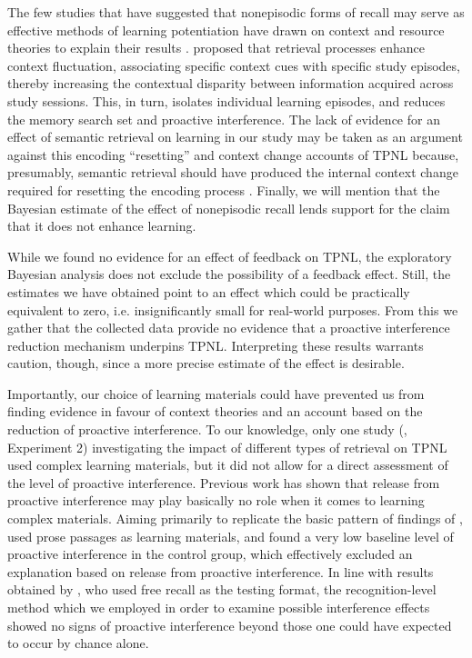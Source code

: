 \documentclass[../main.tex]{subfiles}
\begin{document}
The few studies that have suggested that nonepisodic forms of recall may serve 
as effective methods of learning potentiation have drawn on context and resource
theories to explain their results \citep{divisRetrievalSpeedsContext2014, 
pastotterRetrievalLearningFacilitates2011}. 
\cite{divisRetrievalSpeedsContext2014} proposed that retrieval processes 
enhance context fluctuation, associating specific context cues with specific 
study episodes, thereby increasing the contextual disparity between information 
acquired across study sessions. This, in turn, isolates individual learning 
episodes, and reduces the memory search set and proactive interference.
The lack of evidence for an effect of semantic retrieval 
on learning in our study may be taken as an argument against this encoding 
``resetting'' and context change accounts of TPNL because, presumably, semantic 
retrieval should have produced the internal context change required for 
resetting the encoding process 
\citep{pastotterRetrievalLearningFacilitates2011}. Finally, we will mention that
the Bayesian estimate of the effect of nonepisodic recall lends support for the
claim that it does not enhance learning.

While we found no evidence for an effect of feedback on TPNL, the exploratory 
Bayesian analysis does not exclude the possibility of a feedback effect. Still, 
the estimates we have obtained point to an effect which could be practically 
equivalent to zero, i.e. insignificantly small for real-world purposes.
From this we gather that the collected data provide no evidence that a 
proactive interference reduction mechanism underpins TPNL. Interpreting these 
results warrants caution, though, since a more precise estimate of the effect 
is desirable.

Importantly, our choice of learning materials could have prevented us from 
finding evidence in favour of context theories and an account based on the 
reduction of proactive interference. To our knowledge, only one study 
(\citealp{divisRetrievalSpeedsContext2014}, Experiment 2) investigating the 
impact of different types of retrieval on TPNL used complex learning 
materials, but it did not allow for a direct assessment of the level of 
proactive interference. Previous work has shown that release from proactive
interference may play basically no role when it comes to learning complex
materials. Aiming primarily to replicate the basic pattern of findings of 
\cite{szpunarTestingStudyInsulates2008}, \cite{wissmanInterimTestEffect2011} 
used prose passages as learning materials, and found a very low baseline level 
of proactive interference in the control group, which effectively excluded
an explanation based on release from proactive interference. In line with 
results obtained by \cite{wissmanInterimTestEffect2011}, who used free recall 
as the testing format, the recognition-level method which we employed in order 
to examine possible interference effects showed no signs of proactive 
interference beyond those one could have expected to occur by chance alone.
\end{document}
